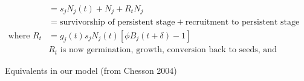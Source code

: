 \documentclass[11pt,a4paper,oneside]{article}
\begin{document}
\begin{align*}
& =s_{j}N_{j}(t) + N_{j} + R_{t}N_{j}\\
& = \text{survivorship of persistent stage} + \text{recruitment to persistent stage}
\\ \text{where  }
R_{t} & = g_{j}(t)s_{j}N_{j}(t)[\phi B_{j}(t+\delta)-1]
\\ & R_{t}\text{ is now germination, growth, conversion back to seeds, and overwinter survival}
\end{align*}

Equivalents in our model (from Chesson 2004)
\end{document}
